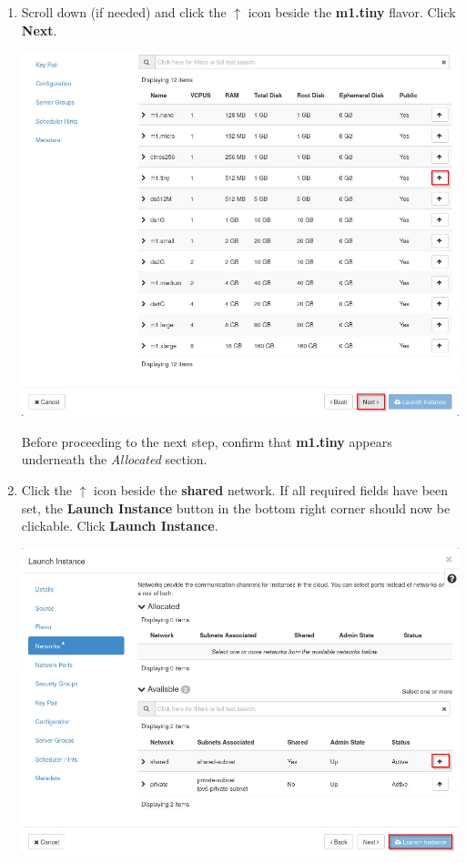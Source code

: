 \documentclass[letterpaper, 12pt]{article}
\begin{document}
\begin{enumerate}
    \item Scroll down (if needed) and click the $\uparrow$ icon beside the \textbf{m1.tiny} flavor. Click \textbf{Next}.
    
    \begin{center}
        \includegraphics[width=\linewidth]{images/part_1_step_12.png}
    \end{center}

    \begin{stopbox}{}
        Before proceeding to the next step, confirm that \textbf{m1.tiny} appears underneath the \textit{Allocated}
        section.
    \end{stopbox}

    \item Click the $\uparrow$ icon beside the \textbf{shared} network. If all required fields have been set, the
    \textbf{Launch Instance} button in the bottom right corner should now be clickable. Click \textbf{Launch Instance}.

    \begin{center}
        \includegraphics[width=\linewidth]{images/part_1_step_13.png}
    \end{center}


\end{enumerate}
\end{document}

